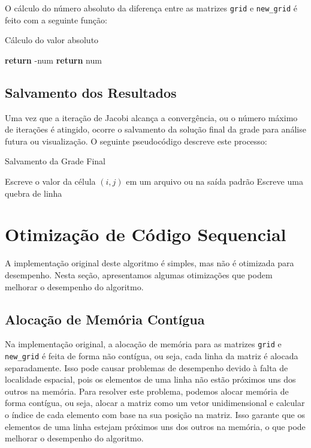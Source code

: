 \documentclass[conference]{IEEEtran}
\begin{document}
O cálculo do número absoluto da diferença entre as matrizes \texttt{grid} e \texttt{new\_grid} é feito com a seguinte função:

\begin{algorithm}[H]
    \caption{Cálculo do valor absoluto}
    \begin{algorithmic}[1]
        \State \textbf{return} -num
        \Else
        \State \textbf{return} num
        \EndIf
        \EndFunction
    \end{algorithmic}
\end{algorithm}

\subsection{Salvamento dos Resultados}

Uma vez que a iteração de Jacobi alcança a convergência, ou o número máximo de iterações é atingido, ocorre o salvamento da solução final da grade para análise futura ou visualização. O seguinte pseudocódigo descreve este processo:

\begin{algorithm}[H]
    \caption{Salvamento da Grade Final}
    \begin{algorithmic}[1]
        \State Escreve o valor da célula $(i, j)$ em um arquivo ou na saída padrão
        \EndFor
        \State Escreve uma quebra de linha
        \EndFor
        \EndFunction
    \end{algorithmic}
\end{algorithm}

\section{Otimização de Código Sequencial}

A implementação original deste algoritmo é simples, mas não é otimizada para desempenho. Nesta seção, apresentamos algumas otimizações que podem melhorar o desempenho do algoritmo.

\subsection{Alocação de Memória Contígua}

Na implementação original, a alocação de memória para as matrizes \texttt{grid} e \texttt{new\_grid} é feita de forma não contígua, ou seja, cada linha da matriz é alocada separadamente. Isso pode causar problemas de desempenho devido à falta de localidade espacial, pois os elementos de uma linha não estão próximos uns dos outros na memória. Para resolver este problema, podemos alocar memória de forma contígua, ou seja, alocar a matriz como um vetor unidimensional e calcular o índice de cada elemento com base na sua posição na matriz. Isso garante que os elementos de uma linha estejam próximos uns dos outros na memória, o que pode melhorar o desempenho do algoritmo.
\end{document}
